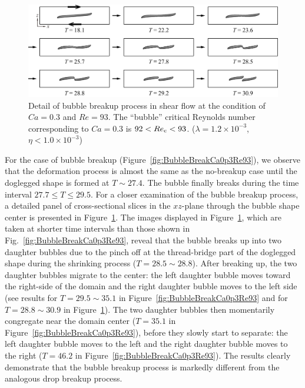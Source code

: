 \documentclass[%
 reprint,
 showkeys,
 amsmath,amssymb,
 aps,
 prfluids,
 onecolumn
]{revtex4-2}
\begin{document}
%
\begin{figure}%
  \centering
  \includegraphics[width=\textwidth]{BubBreakCa0p3Re93Detail}
  \caption{Detail of bubble breakup process in shear flow at the condition
           of $Ca=0.3$ and $Re=93$.
	   The ``bubble'' 
	   critical Reynolds number corresponding to $Ca=0.3$ is
	   $92<Re_{\rm c}<93$.
           ($\lambda = 1.2 \times 10^{-3}$, $\eta < 1.0 \times 10^{-3}$) 
	   }
  \label{fig:BubBreakCa0p3Re93Detail}
\end{figure}
%
For the case of bubble breakup (Figure~\ref{fig:BubbleBreakCa0p3Re93}), we
observe that the deformation process is almost {\color{red}the} same as the no-breakup case
until the doglegged shape is formed at $T \sim 27.4$. The bubble finally breaks
during the time interval $27.7 \leq T \leq 29.5$.  For a closer examination of
the bubble breakup process, a detailed panel of cross-sectional slices in the
$xz$-plane through the bubble shape center is presented in
Figure~\ref{fig:BubBreakCa0p3Re93Detail}.  The images displayed in
Figure~\ref{fig:BubBreakCa0p3Re93Detail}, which are taken at shorter time
intervals than those shown in Fig.~\ref{fig:BubbleBreakCa0p3Re93}, reveal that
the bubble breaks up into two daughter bubbles due to the pinch off at the
thread-bridge part of the doglegged shape during the shrinking process ($T =
28.5 \sim 28.8$).  After breaking up, the two daughter bubbles migrate to the
center: the left daughter bubble moves toward the right-side of the domain and
the right daughter bubble moves to the left side (see results for $T = 29.5
\sim 35.1$ in Figure~\ref{fig:BubbleBreakCa0p3Re93} and for $T = 28.8 \sim
30.9$ in Figure~\ref{fig:BubBreakCa0p3Re93Detail}).  The two daughter bubbles
then momentarily congregate near the domain center ($T = 35.1$ in
Figure~\ref{fig:BubbleBreakCa0p3Re93}), before they slowly start to separate:
the left daughter bubble moves to the left and the right daughter bubble moves
to the right ($T = 46.2$ in Figure~\ref{fig:BubbleBreakCa0p3Re93}).  The
results clearly demonstrate that the bubble breakup process is markedly
different from the analogous drop breakup process. 
\end{document}
